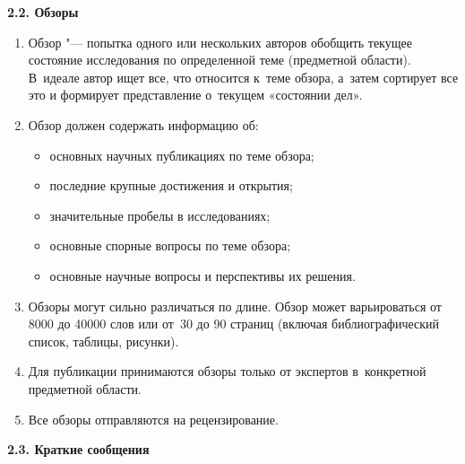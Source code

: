 {\bf 2.2. Обзоры}



\begin{enumerate}



\item[1.] Обзор "--- попытка одного или нескольких авторов обобщить текущее состояние исследования по определенной теме (предметной области). В~идеале автор ищет все, что относится к~теме обзора, а~затем сортирует все это и формирует представление о~текущем «состоянии дел». 



\item[2.] Обзор должен содержать информацию об:

\begin{itemize}

\item основных научных публикациях по теме обзора;

\item последние крупные достижения и открытия;

\item значительные пробелы в исследованиях;

\item основные спорные вопросы по теме обзора;

\item основные научные вопросы и перспективы их решения.

\end{itemize}



\item[3.]  Обзоры могут сильно различаться по длине. Обзор может варьироваться от 8000 до 40000 слов или от~30 до 90 страниц (включая библиографический список, таблицы, рисунки).



\item[4.]  Для публикации принимаются обзоры только  от экспертов в~конкретной предметной области.



\item[5.]  Все обзоры отправляются на рецензирование.



\end{enumerate}





{\bf 2.3. Краткие сообщения}



